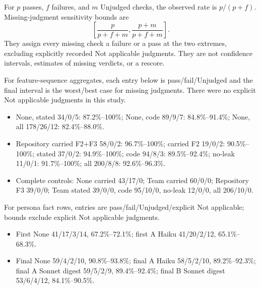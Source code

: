 For $p$ passes, $f$ failures, and $m$ Unjudged checks, the observed rate is $p/(p+f)$. Missing-judgment sensitivity bounds are
\[
\left[\frac{p}{p+f+m},\frac{p+m}{p+f+m}\right].
\]
They assign every missing check a failure or a pass at the two extremes, excluding explicitly recorded Not applicable judgments. They are not confidence intervals, estimates of missing verdicts, or a rescore.

For feature-sequence aggregates, each entry below is pass/fail/Unjudged and the final interval is the worst/best case for missing judgments. There were no explicit Not applicable judgments in this study.
\begin{itemize}[nosep]
  \item None, stated 34/0/5: 87.2\%--100\%; None, code 89/9/7: 84.8\%--91.4\%; None, all 178/26/12: 82.4\%--88.0\%.
  \item Repository carried F2+F3 58/0/2: 96.7\%--100\%; carried F2 19/0/2: 90.5\%--100\%; stated 37/0/2: 94.9\%--100\%; code 94/8/3: 89.5\%--92.4\%; no-leak 11/0/1: 91.7\%--100\%; all 200/8/8: 92.6\%--96.3\%.
  \item Complete controls: None carried 43/17/0; Team carried 60/0/0; Repository F3 39/0/0; Team stated 39/0/0, code 95/10/0, no-leak 12/0/0, all 206/10/0.
\end{itemize}

For persona fact rows, entries are pass/fail/Unjudged/explicit Not applicable; bounds exclude explicit Not applicable judgments.
\begin{itemize}[nosep]
  \item First None 41/17/3/14, 67.2\%--72.1\%; first A Haiku 41/20/2/12, 65.1\%--68.3\%.
  \item Final None 59/4/2/10, 90.8\%--93.8\%; final A Haiku 58/5/2/10, 89.2\%--92.3\%; final A Sonnet digest 59/5/2/9, 89.4\%--92.4\%; final B Sonnet digest 53/6/4/12, 84.1\%--90.5\%.
\end{itemize}
